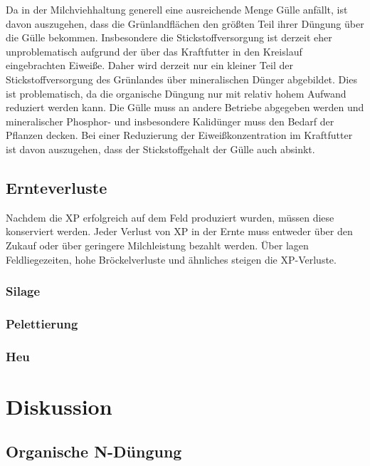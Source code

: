 \documentclass[12pt,titlepage]{scrartcl}
\begin{document}
Da in der Milchviehhaltung generell eine ausreichende Menge Gülle anfällt, ist davon auszugehen, dass die Grünlandflächen den größten Teil ihrer Düngung über die Gülle bekommen.
Insbesondere die Stickstoffversorgung ist derzeit eher unproblematisch aufgrund der über das Kraftfutter in den Kreislauf eingebrachten Eiweiße.
Daher wird derzeit nur ein kleiner Teil der Stickstoffversorgung des Grünlandes über mineralischen Dünger abgebildet.
Dies ist problematisch, da die organische Düngung nur mit relativ hohem Aufwand reduziert werden kann.
Die Gülle muss an andere Betriebe abgegeben werden und mineralischer Phosphor- und insbesondere Kalidünger muss den Bedarf der Pflanzen decken.
Bei einer Reduzierung der Eiweißkonzentration im Kraftfutter ist davon auszugehen, dass der Stickstoffgehalt der Gülle auch absinkt.

\subsection{Ernteverluste}
\label{subsec:Lit:Ernte}

Nachdem die \ac{XP} erfolgreich auf dem Feld produziert wurden, müssen diese konserviert werden.
Jeder Verlust von \ac{XP} in der Ernte muss entweder über den Zukauf oder über geringere Milchleistung bezahlt werden.
Über lagen Feldliegezeiten, hohe Bröckelverluste und ähnliches steigen die \ac{XP}-Verluste.

\subsubsection{Silage}
\label{subsub:Silange}

\subsubsection{Pelettierung}
\label{subsub:Peletts}

\subsubsection{Heu}
\label{subsub:Heu}

\section{Diskussion}
\label{sec:Disukussion}

\subsection{Organische N-Düngung}
\label{subsec:Dis:orgN}
\end{document}
